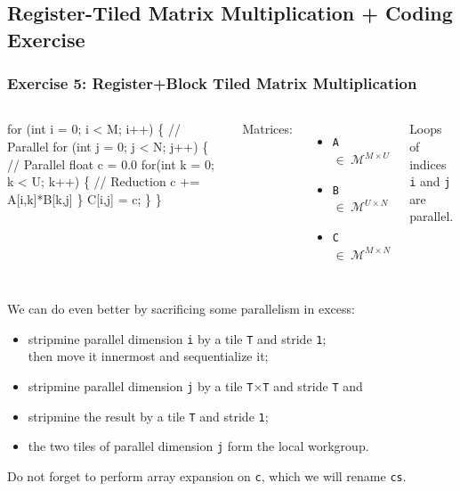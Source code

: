 \documentclass{beamer}
\newcommand{\emp}[1]{\textcolor{DikuRed}{ #1}}
\newcommand{\emphh}[1]{\textcolor{CosGreen}{ #1}}
\begin{document}
\subsection{Register-Tiled Matrix Multiplication + Coding Exercise}

\begin{frame}[fragile,t]
  \frametitle{Exercise 5: Register+Block Tiled Matrix Multiplication}

\begin{columns}
\begin{colorcode}[fontsize=\scriptsize]
for (int i = 0; i < M; i++) \{  \emphh{// Parallel}
  for (int j = 0; j < N; j++) \{  \emphh{// Parallel}
    float c = 0.0
    for(int k = 0; k < U; k++) \{ \emp{// Reduction}
      c += A[i,k]*B[k,j] 
    \}
    C[i,j] = c;          
  \}
\}
\end{colorcode}
Matrices:
\begin{itemize}
    \item {\tt A $\in~\mathcal{M}^{M \times U}$}
    \item {\tt B $\in~\mathcal{M}^{U \times N}$}
    \item {\tt C$\in~\mathcal{M}^{M \times N}$} 
\end{itemize}
Loops of indices {\tt i} and {\tt j} are parallel.
\end{columns}

\bigskip

We can do even better by sacrificing some parallelism in excess:
\begin{itemize}
    \item stripmine parallel dimension {\tt i} by a tile {\tt T} and stride {\tt 1};\\
          then move it innermost and sequentialize it;
    \item stripmine parallel dimension {\tt j} by a tile {\tt T$\times$T} and stride {\tt T} and
    \item stripmine the result by a tile {\tt T} and stride {\tt 1};
    \item the two tiles of parallel dimension {\tt j} form the local workgroup.
\end{itemize}

Do not forget to perform array expansion on {\tt c}, which we will rename {\tt cs}.
\end{frame}
\end{document}
